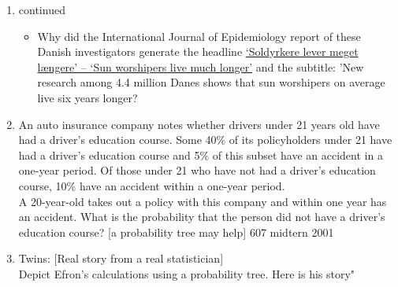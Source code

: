 \documentclass[]{book}
\providecommand{\tightlist}{%
  \setlength{\itemsep}{0pt}\setlength{\parskip}{0pt}}
\begin{document}
\begin{enumerate}
\def\labelenumi{\arabic{enumi}.}
\setcounter{enumi}{6}
\item
  continued

  \begin{itemize}
  \tightlist
  \item
    Why did the International Journal of Epidemiology report of these Danish investigators generate the headline \href{http://www.medicine.mcgill.ca/epidemiology/hanley/Reprints/3FRIAS2016_Session1_Invited1_Hanley.pdf\#page=65}{`Soldyrkere lever meget længere' -- `Sun worshipers live much longer'} and the subtitle: 'New research among 4.4 million Danes shows that sun worshipers on average live six years longer?
  \end{itemize}
\item
  An auto insurance company notes whether drivers under 21 years old have had a driver's education course. Some 40\% of its policyholders under 21 have had a driver's education course and 5\% of this subset have an accident in a one-year period. Of those under 21 who have not had a driver's education course, 10\% have an accident within a one-year period.\\
  A 20-year-old takes out a policy with this company and within one year has an accident. What is the probability that the person did not have a driver's education course? {[}a probability tree may help{]} 607 midtern 2001
\item
  Twins: {[}Real story from a real statistician{]}\\
  Depict Efron's calculations using a probability tree. Here is his story"
\end{enumerate}
\end{document}
